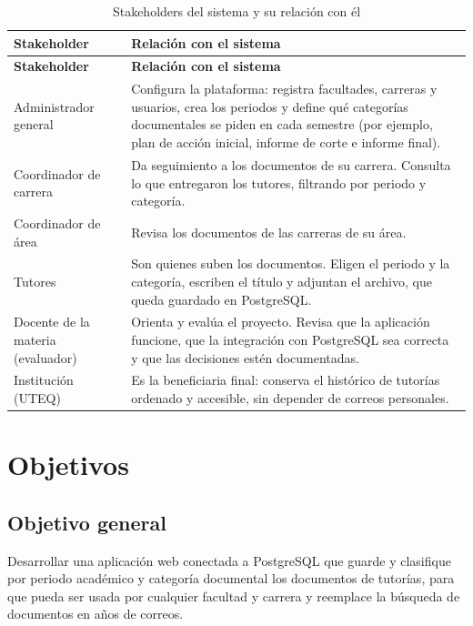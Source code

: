 \begin{longtable}{>{\raggedright\arraybackslash}p{3.7cm}>{\raggedright\arraybackslash}p{11.3cm}}
\caption{Stakeholders del sistema y su relación con él}\label{tab:stakeholders}\\
\toprule
\textbf{Stakeholder} & \textbf{Relación con el sistema} \\
\midrule
\endfirsthead
\toprule
\textbf{Stakeholder} & \textbf{Relación con el sistema} \\
\midrule
\endhead
Administrador general &
Configura la plataforma: registra facultades, carreras y usuarios, crea los periodos
y define qué categorías documentales se piden en cada semestre (por ejemplo, plan de
acción inicial, informe de corte e informe final). \\
\addlinespace
Coordinador de carrera &
Da seguimiento a los documentos de su carrera. Consulta lo que entregaron los tutores,
filtrando por periodo y categoría. \\
\addlinespace
Coordinador de área &
Revisa los documentos de las carreras de su área. \\
\addlinespace
Tutores &
Son quienes suben los documentos. Eligen el periodo y la categoría, escriben el título
y adjuntan el archivo, que queda guardado en PostgreSQL. \\
\addlinespace
Docente de la materia (evaluador) &
Orienta y evalúa el proyecto. Revisa que la aplicación funcione, que la integración con
PostgreSQL sea correcta y que las decisiones estén documentadas. \\
\addlinespace
Institución (UTEQ) &
Es la beneficiaria final: conserva el histórico de tutorías ordenado y accesible,
sin depender de correos personales. \\
\bottomrule
\end{longtable}

\section{Objetivos}

\subsection{Objetivo general}

Desarrollar una aplicación web conectada a PostgreSQL que guarde y clasifique por
periodo académico y categoría documental los documentos de tutorías, para que pueda
ser usada por cualquier facultad y carrera y reemplace la búsqueda de documentos en
años de correos.

